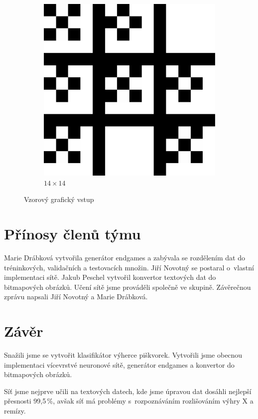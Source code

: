 \documentclass[10pt,a4paper]{article}
\begin{document}
\begin{figure}[h!]
\begin{subfigure}{.5\textwidth}
  \includegraphics[scale=0.1]{vzor14}
  \caption{$14\times 14$}
  \label{fig:v2}
\end{subfigure}
\caption{Vzorový grafický vstup}
\label{fig:v}
\end{figure}

\FloatBarrier
\section*{Přínosy členů týmu}
Marie Drábková vytvořila generátor endgames a zabývala se rozdělením dat do tréninkových, validačních a testovacích množin. 
Jiří Novotný se postaral o~vlastní implementaci sítě.
Jakub Peschel vytvořil konvertor textových dat do bitmapových obrázků.
Učení sítě jsme prováděli společně ve skupině.
Závěrečnou zprávu napsali Jiří Novotný a Marie Drábková.

\section*{Závěr}
Snažili jsme se vytvořit klasifikátor výherce piškvorek. Vytvořili jsme obecnou implementaci vícevrstvé neuronové sítě, generátor endgames a konvertor do bitmapových obrázků. 

Síť jsme nejprve učili na textových datech, kde jsme úpravou dat dosáhli nejlepší přesnosti 99,5\,\%, avšak síť má problémy s~rozpoznáváním rozlišováním výhry X a remízy. 
\end{document}

